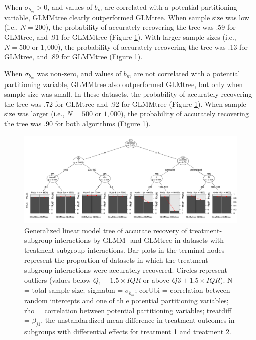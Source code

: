 \documentclass[nobf,doc]{apa}
\begin{document}
When $\sigma_{b_m} > 0$, and values of $b_m$ are correlated with a potential partitioning variable, GLMMtree clearly outperformed GLMtree. When sample size was low (i.e., $N=200$), the probability of accurately recovering the tree was .59 for GLMtree, and .91 for GLMMtree (Figure \ref{fig:treeaccuracytree}). With larger sample sizes (i.e., $N=500$ or $1,000$), the probability of accurately recovering the tree was .13 for GLMtree, and .89 for GLMMtree (Figure \ref{fig:treeaccuracytree}).

When $\sigma_{b_m}$ was non-zero, and values of $b_m$ are not correlated with a potential partitioning variable, GLMMtree also outperformed GLMtree, but only when sample size was small. In these datasets, the probability of accurately recovering the tree was .72 for GLMtree and .92 for GLMMtree (Figure \ref{fig:treeaccuracytree}). When sample size was larger (i.e., $N=500$ or $1,000$), the probability of accurately recovering the tree was .90 for both algorithms (Figure \ref{fig:treeaccuracytree}). 

\begin{figure}
	\includegraphics[width=20cm]{truetree_mob_maxdepth=4.pdf}
	\caption{Generalized linear model tree of accurate recovery of treatment-subgroup interactions by GLMM- and GLMtree in datasets with treatment-subgroup interactions. Bar plots in the terminal nodes represent the proportion of datasets in which the treatment-subgroup interactions were accurately recovered. Circles represent outliers (values below $Q_1 - 1.5 \times IQR$ or above $Q3 + 1.5 \times IQR$). N = total sample size; sigmabm = $\sigma_{b_m}$; corUbi = correlation between random intercepts and one of th e potential partitioning variables; rho = correlation between potential partitioning variables; treatdiff = $\beta_{j1}$, the unstandardized mean difference in treatment outcomes in subgroups with differential effects for treatment 1 and treatment 2.}
	\label{fig:treeaccuracytree}
\end{figure}
\end{document}
